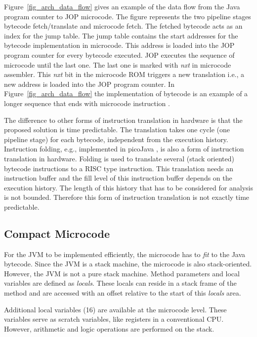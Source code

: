 Figure~\ref{fig_arch_data_flow} gives an example of the data flow
from the Java program counter to JOP microcode. The figure
represents the two pipeline stages bytecode fetch/translate and
microcode fetch. The fetched bytecode acts as an index for the jump
table. The jump table contains the start addresses for the bytecode
implementation in microcode. This address is loaded into the JOP
program counter for every bytecode executed. JOP executes the
sequence of microcode until the last one. The last one is marked
with \emph{nxt} in microcode assembler. This \emph{nxt} bit in the
microcode ROM triggers a new translation i.e., a new address is
loaded into the JOP program counter. In
Figure~\ref{fig_arch_data_flow} the implementation of bytecode
 is an example of a longer sequence that ends with
microcode instruction .

The difference to other forms of instruction translation in hardware
is that the proposed solution is time predictable. The translation
takes one cycle (one pipeline stage) for each bytecode, independent
from the execution history. Instruction folding, e.g., implemented
in picoJava \cite{pJ1,pjMicroArch}, is also a form of instruction
translation in hardware. Folding is used to translate several (stack
oriented) bytecode instructions to a RISC type instruction. This
translation needs an instruction buffer and the fill level of this
instruction buffer depends on the execution history. The length of
this history that has to be considered for analysis is not bounded.
Therefore this form of instruction translation is not exactly time
predictable.


\subsection{Compact Microcode}

For the JVM to be implemented efficiently, the microcode has to
\emph{fit} to the Java bytecode. Since the JVM is a stack machine,
the microcode is also stack-oriented. However, the JVM is not a pure
stack machine. Method parameters and local variables are defined as
\emph{locals}. These locals can reside in a stack frame of the
method and are accessed with an offset relative to the start of this
\emph{locals} area.

Additional local variables (16) are available at the microcode
level. These variables serve as scratch variables, like registers in
a conventional CPU. However, arithmetic and logic operations are
performed on the stack.

